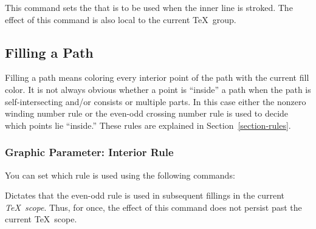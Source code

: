 \begin{command}{\pgfsetinnerstrokecolor{}}
  This command sets the  that is to be used when the inner
  line is stroked. The effect of this command is also local to the
  current \TeX\ group.

\begin{codeexample}[]
\begin{pgfpicture}
  \pgfpathmoveto{\pgfpointorigin}
  \pgfpathlineto{\pgfpoint{1cm}{1cm}}
  \pgfpathlineto{\pgfpoint{1cm}{0cm}}
  \pgfsetlinewidth{2pt}
  \pgfsetinnerlinewidth{1pt}
\end{pgfpicture}
\end{codeexample}  
\end{command}


\subsection{Filling a Path}
\label{section-fill}

Filling a path means coloring every interior point of the path with
the current fill color. It is not always obvious whether a point is
``inside'' a  path when the path is self-intersecting and/or consists
or multiple parts. In this case either the nonzero winding number rule
or the even-odd crossing number rule is used to decide which points
lie ``inside.'' These rules are explained in
Section~\ref{section-rules}. 

\subsubsection{Graphic Parameter: Interior Rule}

You can set which rule is used using the following commands:

\begin{command}{\pgfseteorule}
  Dictates that the even-odd rule is used in subsequent fillings in
  the current \emph{\TeX\ scope}. Thus, for once, the effect of this
  command does not persist past the current \TeX\ scope.

\begin{codeexample}[]
\begin{pgfpicture}
  \pgfseteorule
  \pgfpathcircle{\pgfpoint{0mm}{0cm}}{7mm}
  \pgfpathcircle{\pgfpoint{5mm}{0cm}}{7mm}
\end{pgfpicture}
\end{codeexample}
\end{command}


